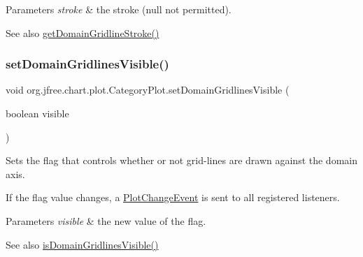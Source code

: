 \begin{DoxyParams}{Parameters}
{\em stroke} & the stroke ({\ttfamily null} not permitted).\\
\hline
\end{DoxyParams}
\begin{DoxySeeAlso}{See also}
\mbox{\hyperlink{classorg_1_1jfree_1_1chart_1_1plot_1_1_category_plot_a3ea6085f3ef4c8c76c1e2ed9e8f6650b}{get\+Domain\+Gridline\+Stroke()}} 
\end{DoxySeeAlso}
\mbox{\label{classorg_1_1jfree_1_1chart_1_1plot_1_1_category_plot_a8abc131b37e368eda1d81c22974386ae}} 
\subsubsection{\texorpdfstring{set\+Domain\+Gridlines\+Visible()}{setDomainGridlinesVisible()}}
{\footnotesize\ttfamily void org.\+jfree.\+chart.\+plot.\+Category\+Plot.\+set\+Domain\+Gridlines\+Visible (\begin{DoxyParamCaption}\item[{boolean}]{visible }\end{DoxyParamCaption})}

Sets the flag that controls whether or not grid-\/lines are drawn against the domain axis. 

If the flag value changes, a \mbox{\hyperlink{}{Plot\+Change\+Event}} is sent to all registered listeners.


\begin{DoxyParams}{Parameters}
{\em visible} & the new value of the flag.\\
\hline
\end{DoxyParams}
\begin{DoxySeeAlso}{See also}
\mbox{\hyperlink{classorg_1_1jfree_1_1chart_1_1plot_1_1_category_plot_a597b375b0629f51761c50881045a2f99}{is\+Domain\+Gridlines\+Visible()}} 
\end{DoxySeeAlso}
\mbox{\label{classorg_1_1jfree_1_1chart_1_1plot_1_1_category_plot_ac261da7da2048f2b53f78ef996dfc2c5}} 
